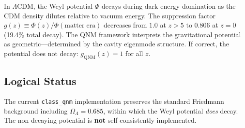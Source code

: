 \documentclass[aps,prd,twocolumn,superscriptaddress,showpacs,preprintnumbers,amsmath,amssymb,nofootinbib]{revtex4-2}
\newcommand{\lcdm}{$\Lambda$CDM}
\begin{document}
In \lcdm, the Weyl potential $\Phi$ decays during dark energy domination as the CDM density dilutes relative to vacuum energy. The suppression factor $g(z) \equiv \Phi(z)/\Phi(\mathrm{matter\;era})$ decreases from $1.0$ at $z > 5$ to $0.806$ at $z = 0$ (19.4\% total decay). The QNM framework interprets the gravitational potential as geometric---determined by the cavity eigenmode structure. If correct, the potential does not decay: $g_\mathrm{QNM}(z) = 1$ for all $z$.

\subsection{Logical Status}
\label{sec:al_status}

The current \texttt{class\_qnm} implementation preserves the standard Friedmann background including $\Omega_\Lambda = 0.685$, within which the Weyl potential \emph{does} decay. The non-decaying potential is \textbf{not} self-consistently implemented.
\end{document}
